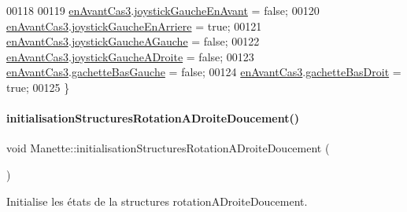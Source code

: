 \begin{DoxyCode}
00118 
00119     \hyperlink{class_manette_a4546e6f56bac4a9e99a92539a68f3c5c}{enAvantCas3}.\hyperlink{struct_etat_manette_deplacement_a8c8e3ca694408bc6a6ced4e20b9da0be}{joystickGaucheEnAvant} = \textcolor{keyword}{false};
00120     \hyperlink{class_manette_a4546e6f56bac4a9e99a92539a68f3c5c}{enAvantCas3}.\hyperlink{struct_etat_manette_deplacement_a584cf1538425c87588c5b96b79c8d482}{joystickGaucheEnArriere} = \textcolor{keyword}{true};
00121     \hyperlink{class_manette_a4546e6f56bac4a9e99a92539a68f3c5c}{enAvantCas3}.\hyperlink{struct_etat_manette_deplacement_af7e92a8d8f116e2bc4a5a95386f604e7}{joystickGaucheAGauche} = \textcolor{keyword}{false};
00122     \hyperlink{class_manette_a4546e6f56bac4a9e99a92539a68f3c5c}{enAvantCas3}.\hyperlink{struct_etat_manette_deplacement_a8fa93da5af430ac00ffd4ee8b76987a2}{joystickGaucheADroite} = \textcolor{keyword}{false};
00123     \hyperlink{class_manette_a4546e6f56bac4a9e99a92539a68f3c5c}{enAvantCas3}.\hyperlink{struct_etat_manette_deplacement_a0d197e25bc2e0402a068a8d012c25472}{gachetteBasGauche} = \textcolor{keyword}{false};
00124     \hyperlink{class_manette_a4546e6f56bac4a9e99a92539a68f3c5c}{enAvantCas3}.\hyperlink{struct_etat_manette_deplacement_a4588620c1e2a3543ce67c9a791aac106}{gachetteBasDroit} = \textcolor{keyword}{true};
00125 \}
\end{DoxyCode}
\mbox{\label{class_manette_aba0348198bad2dff52fe71684d73c2df}} 
\paragraph{\texorpdfstring{initialisation\+Structures\+Rotation\+A\+Droite\+Doucement()}{initialisationStructuresRotationADroiteDoucement()}}
{\footnotesize\ttfamily void Manette\+::initialisation\+Structures\+Rotation\+A\+Droite\+Doucement (\begin{DoxyParamCaption}{ }\end{DoxyParamCaption})\hspace{0.3cm}{\ttfamily [private]}}



Initialise les états de la structures rotation\+A\+Droite\+Doucement. 



